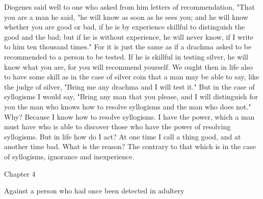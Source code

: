 \documentclass[a4paper]{article}
\begin{document}
    Diogenes said well to one who asked from him letters of recommendation,
"That you are a man he said, "he will know as soon as he sees you; and he will
know whether you are good or bad, if he is by experience skillful to
distinguish the good and the bad; but if he is without experience, he will
never know, if I write to him ten thousand times." For it is just the same as
if a drachma asked to be recommended to a person to be tested. If he is
skillful in testing silver, he will know what you are, for you will recommend
yourself. We ought then in life also to have some skill as in the case of
silver coin that a man may be able to say, like the judge of silver, "Bring me
any drachma and I will test it." But in the case of syllogisms I would say,
"Bring any man that you please, and I will distinguish for you the man who
knows how to resolve syllogisms and the man who does not." Why? Because I know
how to resolve syllogisms. I have the power, which a man must have who is able
to discover those who have the power of resolving syllogisms. But in life how
do I act? At one time I call a thing good, and at another time bad. What is the
reason? The contrary to that which is in the case of syllogisms, ignorance and
inexperience.

Chapter 4

Against a person who had once been detected in adultery
\end{document}
